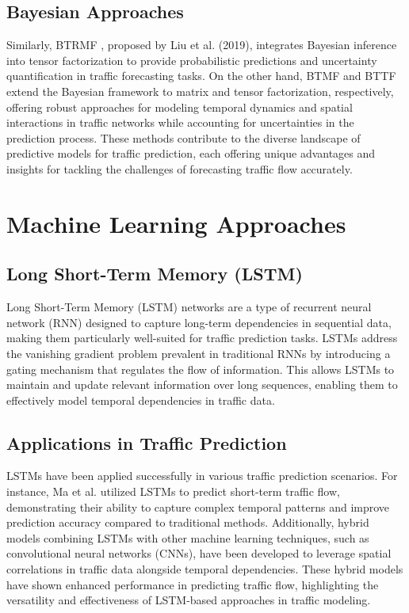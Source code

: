 \subsection{Bayesian Approaches}
Similarly, BTRMF \cite{btrmf}, proposed by Liu et al. (2019), integrates Bayesian inference into tensor factorization to provide probabilistic predictions and uncertainty quantification in traffic forecasting tasks. On the other hand, BTMF and BTTF extend the Bayesian framework to matrix and tensor factorization, respectively, offering robust approaches for modeling temporal dynamics and spatial interactions in traffic networks while accounting for uncertainties in the prediction process. These methods contribute to the diverse landscape of predictive models for traffic prediction, each offering unique advantages and insights for tackling the challenges of forecasting traffic flow accurately.

\section{Machine Learning Approaches}
\subsection{Long Short-Term Memory (LSTM)}
Long Short-Term Memory (LSTM) networks \cite{lstm} are a type of recurrent neural network (RNN) designed to capture long-term dependencies in sequential data, making them particularly well-suited for traffic prediction tasks. LSTMs address the vanishing gradient problem prevalent in traditional RNNs by introducing a gating mechanism that regulates the flow of information. This allows LSTMs to maintain and update relevant information over long sequences, enabling them to effectively model temporal dependencies in traffic data.

\subsection{Applications in Traffic Prediction}
LSTMs have been applied successfully in various traffic prediction scenarios. For instance, Ma et al. utilized LSTMs to predict short-term traffic flow, demonstrating their ability to capture complex temporal patterns and improve prediction accuracy compared to traditional methods. Additionally, hybrid models combining LSTMs with other machine learning techniques, such as convolutional neural networks (CNNs), have been developed to leverage spatial correlations in traffic data alongside temporal dependencies. These hybrid models have shown enhanced performance in predicting traffic flow, highlighting the versatility and effectiveness of LSTM-based approaches in traffic modeling.


